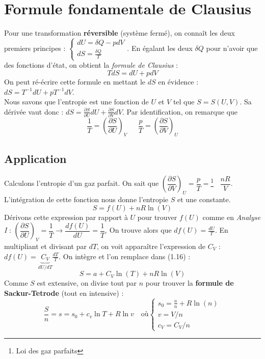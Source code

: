 \documentclass[british,french,11pt, a4paper, openany]{book}
\begin{document}
	\section{Formule fondamentale de Clausius}
	Pour une transformation \textbf{réversible} (système fermé), on connaît les deux premiers principes : $\left\{\begin{array}{l}
	dU = \delta Q - pdV\\
	dS = \frac{\delta Q}{T}
	\end{array}\right.$. En égalant les deux $\delta Q$ pour n'avoir que des fonctions d'état, on obtient la \textit{formule de Clausius} :
	\begin{equation}
	TdS = dU + pdV
	\end{equation}
	On peut ré-écrire cette formule en mettant le $dS$ en évidence : $dS = T^{-1}dU + pT^{-1} dV$.\\
	Nous savons que l'entropie est une fonction de $U$ et $V$ tel que $S = S(U,V)$. Sa dérivée vaut donc : $dS = \frac{\partial S}{\partial U}dU + \frac{\partial S}{\partial V}dV$. Par identification, on remarque que
	\begin{equation}
	\frac{1}{T} = \left(\frac{\partial S}{\partial U}\right)_V\ \ \ \ \ \ \ \frac{p}{T} = \left(\frac{\partial S}{\partial V}\right)_U
	\end{equation}
	
	\subsection{Application}
	Calculons l'entropie d'un gaz parfait. On sait que $\left(\dfrac{\partial S}{\partial V}\right)_U = \dfrac{p}{T} =$\footnote{Loi des gaz parfaits}$ \ \ \ \ \dfrac{nR}{V}$.\\
	L'intégration de cette fonction nous donne l'entropie $S$ et une constante.
	\begin{equation}
	S = f(U) + nR\ln(V)
	\end{equation}
	Dérivons cette expression par rapport à $U$ pour trouver $f(U)$ comme en \textit{Analyse I} : $\left(\dfrac{\partial S}{\partial U}\right)_V = \dfrac{1}{T} \rightarrow \dfrac{df(U)}{dU} = \dfrac{1}{T}$.
	On trouve alors que $df(U) = \frac{dU}{T}$. En multipliant et divisant par $dT$, on voit apparaître l'expression de $C_V$ : $df(U) = \underbrace{C_V}_{dU/dT}\frac{dT}{T}$. On intègre et l'on remplace dans (1.16) :
	\begin{equation}
	S = a + C_V\ln(T) + nR\ln(V)
	\end{equation}
	Comme $S$ est extensive, on divise tout par $n$ pour trouver la \textbf{formule de Sackur-Tetrode} (tout en intensive) :
	\begin{equation}
	\frac{S}{n} = s = s_0 + c_v\ln T + R\ln v\quad\text{où}\left\{\begin{array}{l}
	s_0=\frac{a}{n}+R\ln(n)\\
	v=V/n\\
	c_V=C_V/n
	\end{array}\right.
	\end{equation}
	
\end{document}
